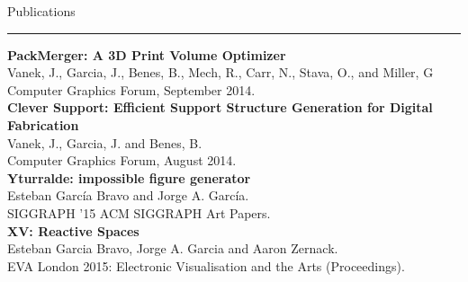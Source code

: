 \documentclass[letterpaper,10pt]{article}
\begin{document}

\begin{minipage}{0.55\textwidth}
\vspace*{3.5cm}
 {\large{Publications}} \\
 \textcolor{Dandelion}{\rule{0.3\textwidth}{0.05in}} 

\textbf{PackMerger: A 3D Print Volume Optimizer} \\
Vanek, J., Garcia, J., Benes, B., Mech, R., Carr, N., Stava, O., and Miller, G\\
Computer Graphics Forum, September 2014.\\

\textbf{Clever Support: Efficient Support Structure Generation for Digital Fabrication} \\
Vanek, J., Garcia, J. and Benes, B.\\
Computer Graphics Forum, August 2014.\\

\textbf{Yturralde: impossible figure generator} \\
Esteban Garc\'{i}a Bravo and Jorge A. Garc\'{i}a.\\
SIGGRAPH '15 ACM SIGGRAPH Art Papers.\\

\textbf{XV: Reactive Spaces} \\
Esteban Garcia Bravo, Jorge A. Garcia and Aaron Zernack.\\
EVA London 2015: Electronic Visualisation and the Arts (Proceedings).
\end{minipage}
%
\hspace{0.05\textwidth}
%
\end{document}
